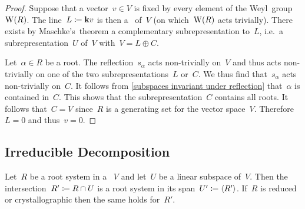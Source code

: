 \begin{proof}
  Suppose that a vector~$v \in V$ is fixed by every element of the Weyl~group~$\operatorname{W}(R)$.
  The line~$L \coloneqq \mathbf{k} v$ is then a~{} of~$V$ (on which~$\operatorname{W}(R)$ acts trivially).
  There exists by Maschke’s~theorem a complementary subrepresentation to~$L$, i.e.\ a subrepresentation~$U$ of~$V$ with~$V = L \oplus C$.
  
  Let~$\alpha \in R$ be a root.
  The reflection~$s_\alpha$ acts non-trivially on~$V$ and thus acts non-trivially on one of the two subrepresentations~$L$ or~$C$.
  We thus find that~$s_\alpha$ acts non-trivially on~$C$.
  It follows from \cref{subspaces invariant under reflection} that~$\alpha$ is contained in~$C$.
  This shows that the subrepresentation~$C$ contains all roots.
  It follows that~$C = V$ since~$R$ is a generating set for the vector space~$V$.
  Therefore~$L = 0$ and thus~$v = 0$.
\end{proof}





\subsection{Irreducible Decomposition}


\begin{lemma}
  \label{induced root system of subspace}
  Let~$R$ be a root system in a {\vectorspace{$\kf$}}~$V$ and let~$U$ be a linear subspace of~$V$.
  Then the intersection~$R' \coloneqq R \cap U$ is a root system in its span~$U' \coloneqq \langle R'\rangle$.
  If~$R$ is reduced or crystallographic then the same holds for~$R'$.
\end{lemma}


